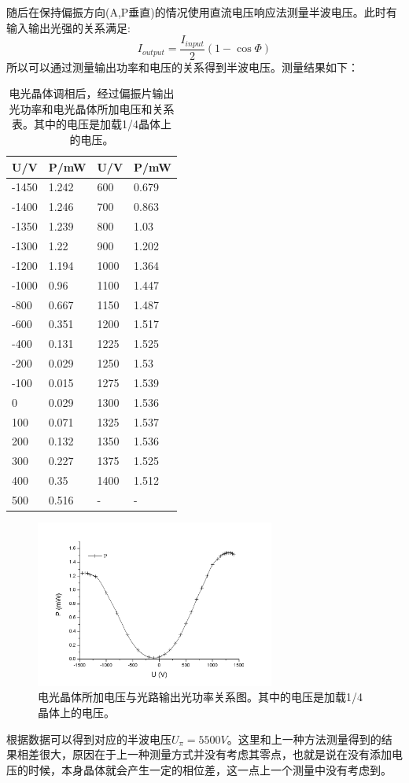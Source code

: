\documentclass[aps,pre,12pt,preprint,onecolumn,showpacs,showkeys,UTF8]{revtex4-1}
\begin{document}
随后在保持偏振方向(A,P垂直)的情况使用直流电压响应法测量半波电压。此时有输入输出光强的关系满足:
\begin{equation}
	I_{output}=\frac{I_{input}}{2}(1-\cos \Phi)
\end{equation}
所以可以通过测量输出功率和电压的关系得到半波电压。测量结果如下：
\begin{table}[ht]
	\centering
	\begin{tabular}{m{3cm}<{\centering}m{3cm}<{\centering}m{3cm}<{\centering}m{3cm}<{\centering}}
		\hline
		\hline
		U/V	&	P/mW	&	U/V	&	P/mW	\\
		\hline
-1450	&	1.242	&	600	&	0.679	\\
-1400	&	1.246	&	700	&	0.863	\\
-1350	&	1.239	&	800	&	1.03	\\
-1300	&	1.22	&	900	&	1.202	\\
-1200	&	1.194	&	1000	&	1.364	\\
-1000	&	0.96	&	1100	&	1.447	\\
-800	&	0.667	&	1150	&	1.487	\\
-600	&	0.351	&	1200	&	1.517	\\
-400	&	0.131	&	1225	&	1.525	\\
-200	&	0.029	&	1250	&	1.53	\\
-100	&	0.015	&	1275	&	1.539	\\
0	&	0.029	&	1300	&	1.536	\\
100	&	0.071	&	1325	&	1.537	\\
200	&	0.132	&	1350	&	1.536	\\
300	&	0.227	&	1375	&	1.525	\\
400	&	0.35	&	1400	&	1.512	\\
500	&	0.516	&	-	&	-	\\
\hline
	\end{tabular}
	\caption{电光晶体调相后，经过偏振片输出光功率和电光晶体所加电压和关系表。其中的电压是加载1/4晶体上的电压。}
	\label{tab:table1}
\end{table}
\begin{figure}[ht]
	\begin{center}
		\includegraphics[width=0.7\textwidth]{pic2.png}
	\end{center}
	\caption{电光晶体所加电压与光路输出光功率关系图。其中的电压是加载1/4晶体上的电压。}
	\label{fig:fig2}
\end{figure}
根据数据可以得到对应的半波电压$U_\pi=5500V$。这里和上一种方法测量得到的结果相差很大，原因在于上一种测量方式并没有考虑其零点，也就是说在没有添加电压的时候，本身晶体就会产生一定的相位差，这一点上一个测量中没有考虑到。
\end{document}
